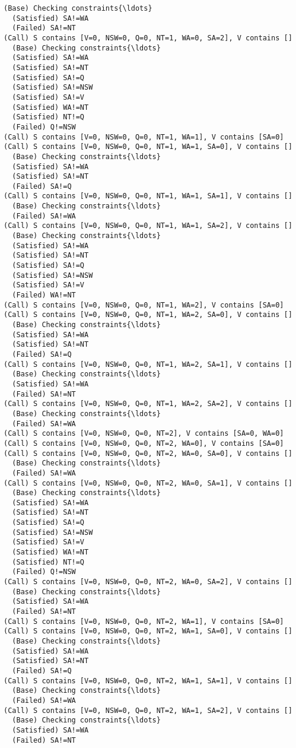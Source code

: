 \documentclass[11pt]{article}
\begin{document}
\begin{Verbatim}[commandchars=\\\{\}]
  (Base) Checking constraints{\ldots}
  (Satisfied) SA!=WA
  (Failed) SA!=NT
(Call) S contains [V=0, NSW=0, Q=0, NT=1, WA=0, SA=2], V contains []
  (Base) Checking constraints{\ldots}
  (Satisfied) SA!=WA
  (Satisfied) SA!=NT
  (Satisfied) SA!=Q
  (Satisfied) SA!=NSW
  (Satisfied) SA!=V
  (Satisfied) WA!=NT
  (Satisfied) NT!=Q
  (Failed) Q!=NSW
(Call) S contains [V=0, NSW=0, Q=0, NT=1, WA=1], V contains [SA=0]
(Call) S contains [V=0, NSW=0, Q=0, NT=1, WA=1, SA=0], V contains []
  (Base) Checking constraints{\ldots}
  (Satisfied) SA!=WA
  (Satisfied) SA!=NT
  (Failed) SA!=Q
(Call) S contains [V=0, NSW=0, Q=0, NT=1, WA=1, SA=1], V contains []
  (Base) Checking constraints{\ldots}
  (Failed) SA!=WA
(Call) S contains [V=0, NSW=0, Q=0, NT=1, WA=1, SA=2], V contains []
  (Base) Checking constraints{\ldots}
  (Satisfied) SA!=WA
  (Satisfied) SA!=NT
  (Satisfied) SA!=Q
  (Satisfied) SA!=NSW
  (Satisfied) SA!=V
  (Failed) WA!=NT
(Call) S contains [V=0, NSW=0, Q=0, NT=1, WA=2], V contains [SA=0]
(Call) S contains [V=0, NSW=0, Q=0, NT=1, WA=2, SA=0], V contains []
  (Base) Checking constraints{\ldots}
  (Satisfied) SA!=WA
  (Satisfied) SA!=NT
  (Failed) SA!=Q
(Call) S contains [V=0, NSW=0, Q=0, NT=1, WA=2, SA=1], V contains []
  (Base) Checking constraints{\ldots}
  (Satisfied) SA!=WA
  (Failed) SA!=NT
(Call) S contains [V=0, NSW=0, Q=0, NT=1, WA=2, SA=2], V contains []
  (Base) Checking constraints{\ldots}
  (Failed) SA!=WA
(Call) S contains [V=0, NSW=0, Q=0, NT=2], V contains [SA=0, WA=0]
(Call) S contains [V=0, NSW=0, Q=0, NT=2, WA=0], V contains [SA=0]
(Call) S contains [V=0, NSW=0, Q=0, NT=2, WA=0, SA=0], V contains []
  (Base) Checking constraints{\ldots}
  (Failed) SA!=WA
(Call) S contains [V=0, NSW=0, Q=0, NT=2, WA=0, SA=1], V contains []
  (Base) Checking constraints{\ldots}
  (Satisfied) SA!=WA
  (Satisfied) SA!=NT
  (Satisfied) SA!=Q
  (Satisfied) SA!=NSW
  (Satisfied) SA!=V
  (Satisfied) WA!=NT
  (Satisfied) NT!=Q
  (Failed) Q!=NSW
(Call) S contains [V=0, NSW=0, Q=0, NT=2, WA=0, SA=2], V contains []
  (Base) Checking constraints{\ldots}
  (Satisfied) SA!=WA
  (Failed) SA!=NT
(Call) S contains [V=0, NSW=0, Q=0, NT=2, WA=1], V contains [SA=0]
(Call) S contains [V=0, NSW=0, Q=0, NT=2, WA=1, SA=0], V contains []
  (Base) Checking constraints{\ldots}
  (Satisfied) SA!=WA
  (Satisfied) SA!=NT
  (Failed) SA!=Q
(Call) S contains [V=0, NSW=0, Q=0, NT=2, WA=1, SA=1], V contains []
  (Base) Checking constraints{\ldots}
  (Failed) SA!=WA
(Call) S contains [V=0, NSW=0, Q=0, NT=2, WA=1, SA=2], V contains []
  (Base) Checking constraints{\ldots}
  (Satisfied) SA!=WA
  (Failed) SA!=NT

\end{Verbatim}
\end{document}
